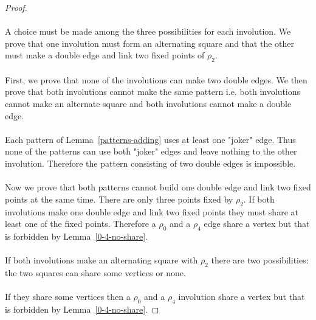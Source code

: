 \begin{proof}
\paragraph{}
A choice must be made among the three possibilities for each involution. We prove that one involution must form an alternating square and that the other must make a double edge and link two fixed points of $\rho_2$.

\paragraph{}
First, we prove that none of the involutions can make two double edges. We then prove that both involutions cannot make the same pattern i.e. both involutions cannot make an alternate square and both involutions cannot make a double edge.

\paragraph{}
Each pattern of Lemma~\ref{patterns-adding} uses at least one "joker" edge. Thus none of the patterns can use both "joker" edges and leave nothing to the other involution. Therefore the pattern consisting of two double edges is impossible.

\paragraph{}
Now we prove that both patterns cannot build one double edge and link two fixed points at the same time. There are only three points fixed by $\rho_2$. If both involutions make one double edge and link two fixed points they must share at least one of the fixed points. Therefore a $\rho_0$ and a $\rho_4$ edge share a vertex but that is forbidden by Lemma~\ref{0-4-no-share}.

\paragraph{}
If both involutions make an alternating square with $\rho_2$ there are two possibilities: the two squares can share some vertices or none.


\paragraph{}
If they share some vertices then a $\rho_0$ and a $\rho_4$ involution share a vertex but that is forbidden by Lemma~\ref{0-4-no-share}.


\end{proof}
